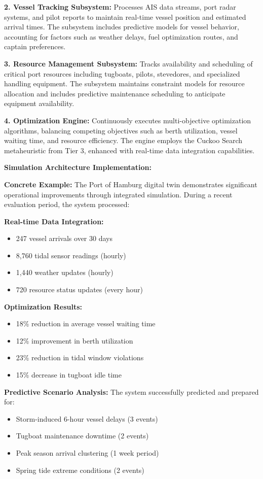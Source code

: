 \documentclass{article}
\begin{document}
\textbf{2. Vessel Tracking Subsystem:}
Processes AIS data streams, port radar systems, and pilot reports to maintain real-time vessel position and estimated arrival times. The subsystem includes predictive models for vessel behavior, accounting for factors such as weather delays, fuel optimization routes, and captain preferences.

\textbf{3. Resource Management Subsystem:}
Tracks availability and scheduling of critical port resources including tugboats, pilots, stevedores, and specialized handling equipment. The subsystem maintains constraint models for resource allocation and includes predictive maintenance scheduling to anticipate equipment availability.

\textbf{4. Optimization Engine:}
Continuously executes multi-objective optimization algorithms, balancing competing objectives such as berth utilization, vessel waiting time, and resource efficiency. The engine employs the Cuckoo Search metaheuristic from Tier 3, enhanced with real-time data integration capabilities.

\textbf{Simulation Architecture Implementation:}


\textbf{Concrete Example:} The Port of Hamburg digital twin demonstrates significant operational improvements through integrated simulation. During a recent evaluation period, the system processed:

\textbf{Real-time Data Integration:}
\begin{itemize}
\item 247 vessel arrivals over 30 days
\item 8,760 tidal sensor readings (hourly)
\item 1,440 weather updates (hourly)
\item 720 resource status updates (every hour)
\end{itemize}

\textbf{Optimization Results:}
\begin{itemize}
\item 18\% reduction in average vessel waiting time
\item 12\% improvement in berth utilization
\item 23\% reduction in tidal window violations
\item 15\% decrease in tugboat idle time
\end{itemize}

\textbf{Predictive Scenario Analysis:} The system successfully predicted and prepared for:
\begin{itemize}
\item Storm-induced 6-hour vessel delays (3 events)
\item Tugboat maintenance downtime (2 events)
\item Peak season arrival clustering (1 week period)
\item Spring tide extreme conditions (2 events)
\end{itemize}
\end{document}
